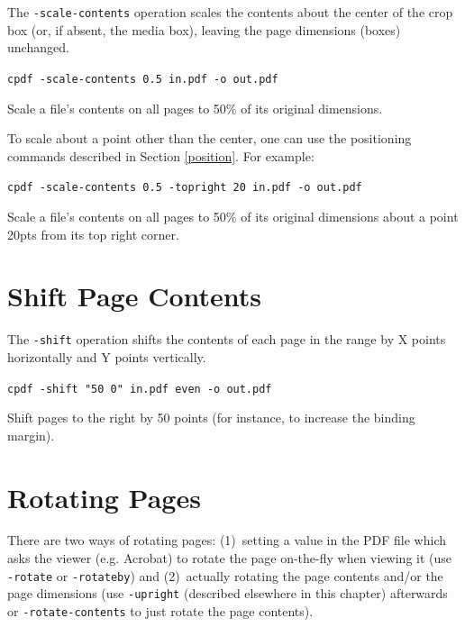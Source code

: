 \documentclass{book}
\begin{document}
The \texttt{-scale-contents} operation scales the contents about the center
  of the crop box (or, if absent, the media box), leaving the page dimensions
  (boxes) unchanged.

  \begin{framed}
  \small\noindent\verb!cpdf -scale-contents 0.5 in.pdf -o out.pdf!

  \vspace{2.5mm}
  \noindent Scale a file's contents on all pages to 50\% of its original dimensions.
  \end{framed}

  \noindent To scale about a point other than the center, one can use the positioning commands described in Section \ref{position}. For example:
  
  \begin{framed}
  \small\noindent\verb!cpdf -scale-contents 0.5 -topright 20 in.pdf -o out.pdf!

  \vspace{2.5mm}
  \noindent Scale a file's contents on all pages to 50\% of its original dimensions about a point 20pts from its top right corner.
  \end{framed}

  

  \section{Shift Page Contents}

  The \texttt{-shift} operation shifts the contents of each page in the range
by X points horizontally and Y points vertically.

  \begin{framed}
  \small\noindent\verb!cpdf -shift "50 0" in.pdf even -o out.pdf!

  \vspace{2.5mm}

  \noindent Shift pages to the right by 50 points (for instance, to increase
the binding margin).

  \end{framed}
  \section{Rotating Pages}

There are two ways of rotating pages: (1)~setting a value in the PDF file which
asks the viewer (e.g. Acrobat) to rotate the page on-the-fly when viewing it
(use \texttt{-rotate} or \texttt{-rotateby}) and (2)~actually rotating the page
contents and/or the page dimensions (use \texttt{-upright} (described elsewhere in this chapter) afterwards or
\texttt{-rotate-contents} to just rotate the page contents).
\end{document}
